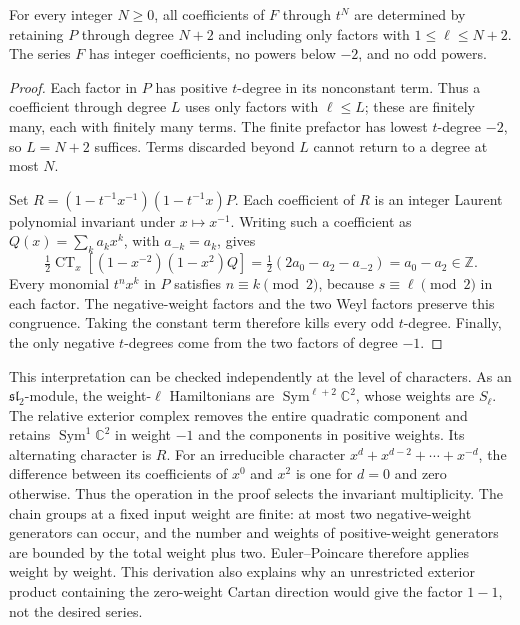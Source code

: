 \begin{lemma}\ours\quad
For every integer \(N\geq0\), all coefficients of \(F\) through
\(t^N\) are determined by retaining \(P\) through degree \(N+2\)
and including only factors with \(1\leq\ell\leq N+2\).
The series \(F\) has integer coefficients, no powers below \(-2\),
and no odd powers.
\end{lemma}
\begin{proof}
Each factor in \(P\) has positive \(t\)-degree in its nonconstant term.
Thus a coefficient through degree \(L\) uses only factors with
\(\ell\leq L\); these are finitely many, each with finitely many terms.
The finite prefactor has lowest \(t\)-degree \(-2\), so \(L=N+2\)
suffices. Terms discarded beyond \(L\) cannot return to a degree at most
\(N\).

Set \(R=(1-t^{-1}x^{-1})(1-t^{-1}x)P\). Each coefficient of \(R\)
is an integer Laurent polynomial invariant under \(x\mapsto x^{-1}\).
Writing such a coefficient as \(Q(x)=\sum_k a_kx^k\), with
\(a_{-k}=a_k\), gives
\[
 \tfrac12\operatorname{CT}_x[(1-x^{-2})(1-x^2)Q]
   =\tfrac12(2a_0-a_2-a_{-2})=a_0-a_2\in\mathbb Z.
\]
Every monomial \(t^n x^k\) in \(P\) satisfies \(n\equiv k\pmod2\),
because \(s\equiv\ell\pmod2\) in each factor. The negative-weight
factors and the two Weyl factors preserve this congruence. Taking the
constant term therefore kills every odd \(t\)-degree. Finally, the only
negative \(t\)-degrees come from the two factors of degree \(-1\).
\end{proof}

\begin{remark}\ours\quad
This interpretation can be checked independently at the level of characters.
As an \(\mathfrak{sl}_2\)-module, the weight-\(\ell\) Hamiltonians are
\(\operatorname{Sym}^{\ell+2}\mathbb C^2\), whose weights are \(S_\ell\).
The relative exterior complex removes the entire quadratic component and
retains \(\operatorname{Sym}^{1}\mathbb C^2\) in weight \(-1\) and
the components in positive weights. Its alternating character is \(R\).
For an irreducible character
\(x^d+x^{d-2}+\cdots+x^{-d}\), the difference between its coefficients
of \(x^0\) and \(x^2\) is one for \(d=0\) and zero otherwise.
Thus the operation in the proof selects the invariant multiplicity.
The chain groups at a fixed input weight are finite: at most two
negative-weight generators can occur, and the number and weights of
positive-weight generators are bounded by the total weight plus two.
Euler--Poincare therefore applies weight by weight. This derivation also
explains why an unrestricted exterior product containing the zero-weight
Cartan direction would give the factor \(1-1\), not the desired series.
\end{remark}

